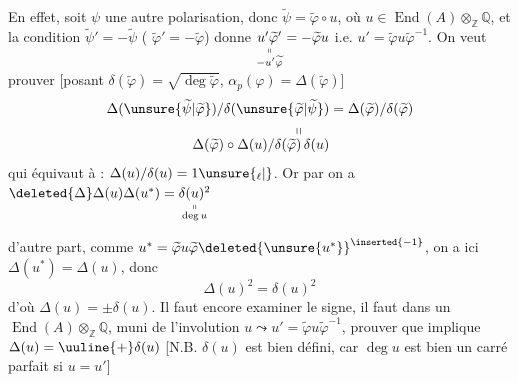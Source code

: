 En effet, soit $\psi$ une autre polarisation, donc
$\widetilde\psi=\widetilde\varphi\circ u$, où $u\in\operatorname{End}(A)\otimes_{\mathbb Z}\mathbb Q$,  et la condition
$\widetilde\psi'=-\widetilde\psi$ ( $\widetilde\varphi'=-\widetilde\varphi$) donne
$\underset{\substack{\shortparallel\\-u'\widetilde\varphi}}{u'\widetilde\varphi'}=-\widetilde\varphi u$
i.e. $u'=\widetilde\varphi u\widetilde\varphi^{-1}$. On veut
prouver [posant $\delta(\widetilde\varphi)=\sqrt{\deg\widetilde\varphi}$, $\alpha_p(\varphi)=\Delta(\widetilde\varphi)$]
\[
\begin{aligned}
\Delta(\unsure{\widetilde\psi|\widetilde\varphi})/\delta(\unsure{\widetilde\varphi|\widetilde\psi})&=\Delta(\widetilde\varphi)/\delta(\widetilde\varphi)\\
\shortparallel\qquad&\\[-1ex]
\Delta(\widetilde\varphi)\circ\Delta(u)/\delta(\widetilde\varphi)\,\delta(u)&
\end{aligned}
\]
qui équivaut à : $\Delta(u)/\delta(u)=1\unsure{{}_{\ell}|{}}$. Or par
 on a $\deleted{\Delta}\Delta(u)\Delta(u^*)=\underset{\substack{\shortparallel\\\deg u}}{\delta(u)^2}$

d'autre part, comme $u^*=\widetilde\varphi u\widetilde\varphi\deleted{\unsure{u^*}}^{\inserted{-1}}$, on a
ici $\Delta(u^*)=\Delta(u)$, donc 
\[
\Delta(u)^2=\delta(u)^2
\]
d'où $\Delta(u)=\pm\delta(u)$. Il faut encore examiner
le signe, il faut  dans un $\operatorname{End}(A)\otimes_{\mathbb Z}\mathbb Q$,
muni de l'involution $u\leadsto u'=\widetilde\varphi u\widetilde\varphi^{-1}$, prouver que
 implique
$\Delta(u)=\uuline{+}\delta(u)$ [N.B. $\delta(u)$ est bien
défini, car $\deg u$ est bien un carré parfait si $u=u'$]

